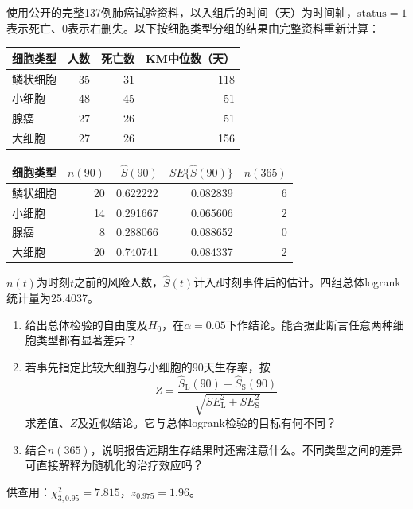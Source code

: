\par\noindent\begin{minipage}{\linewidth}
使用公开的完整137例肺癌试验资料，以入组后的时间（天）为时间轴，$\mathrm{status}=1$表示死亡、$0$表示右删失。以下按细胞类型分组的结果由完整资料重新计算：
\begin{center}\begin{tabular}{lrrr}\toprule
细胞类型 & 人数 & 死亡数 & KM中位数（天）\\\midrule
鳞状细胞 & 35 & 31 & 118\\
小细胞 & 48 & 45 & 51\\
腺癌 & 27 & 26 & 51\\
大细胞 & 27 & 26 & 156\\\bottomrule
\end{tabular}\end{center}
\begin{center}\begin{tabular}{lrrrr}\toprule
细胞类型 & $n(90)$ & $\widehat S(90)$ & $SE\{\widehat S(90)\}$ & $n(365)$\\\midrule
鳞状细胞 & 20 & 0.622222 & 0.082839 & 6\\
小细胞 & 14 & 0.291667 & 0.065606 & 2\\
腺癌 & 8 & 0.288066 & 0.088652 & 0\\
大细胞 & 20 & 0.740741 & 0.084337 & 2\\\bottomrule
\end{tabular}\end{center}
$n(t)$为时刻$t$之前的风险人数，$\widehat S(t)$计入$t$时刻事件后的估计。四组总体logrank统计量为25.4037。
\begin{enumerate}
\item 给出总体检验的自由度及$H_0$，在$\alpha=0.05$下作结论。能否据此断言任意两种细胞类型都有显著差异？
\item 若事先指定比较大细胞与小细胞的90天生存率，按
\[
Z=\frac{\widehat S_{\mathrm L}(90)-\widehat S_{\mathrm S}(90)}
{\sqrt{SE_{\mathrm L}^2+SE_{\mathrm S}^2}}
\]
求差值、$Z$及近似结论。它与总体logrank检验的目标有何不同？
\item 结合$n(365)$，说明报告远期生存结果时还需注意什么。不同类型之间的差异可直接解释为随机化的治疗效应吗？
\end{enumerate}
供查用：$\chi^2_{3,0.95}=7.815$，$z_{0.975}=1.96$。
\end{minipage}\par\medskip

